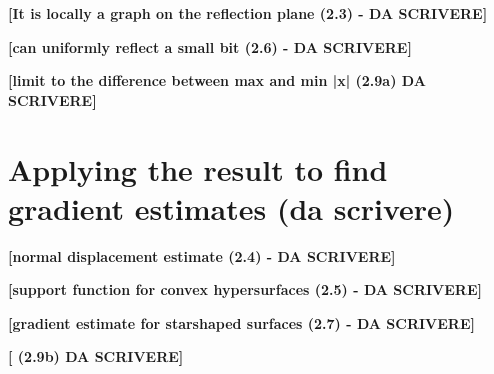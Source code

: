 {\LARGE \textbf{[It is locally a graph on the reflection plane (2.3) - DA SCRIVERE]}}

{\LARGE \textbf{[can uniformly reflect a small bit (2.6) - DA SCRIVERE]}}

{\LARGE \textbf{[limit to the difference between max and min |x| (2.9a) DA SCRIVERE]}}

\section{Applying the result to find gradient estimates (da scrivere)}

{\LARGE \textbf{[normal displacement estimate (2.4) - DA SCRIVERE]}}

{\LARGE \textbf{[support function for convex hypersurfaces (2.5) - DA SCRIVERE]}}

{\LARGE \textbf{[gradient estimate for starshaped surfaces (2.7) - DA SCRIVERE]}}

{\LARGE \textbf{[ (2.9b) DA SCRIVERE]}}

